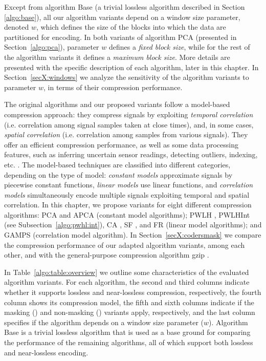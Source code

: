Except from algorithm Base (a trivial lossless algorithm described in Section \ref{algo:base}), all our algorithm variants depend on a window size parameter, denoted $w$, which defines the size of the blocks into which the data are partitioned for encoding. In both variants of algorithm PCA (presented in Section~\ref{algo:pca}), parameter $w$ defines a \textit{fixed block size}, while for the rest of the algorithm variants it defines a \textit{maximum block size}. More details are presented with the specific description of each algorithm, later in this chapter. In Section~\ref{secX:windows} we analyze the sensitivity of the algorithm variants to parameter $w$, in terms of their compression performance.


The original algorithms and our proposed variants follow a model-based compression approach: they compress signals by exploiting \textit{temporal correlation} (i.e. correlation among signal samples taken at close times), and, in some cases, \textit{spatial correlation} (i.e. correlation among samples from various signals). They offer an efficient compression performance, as well as some data processing features, such as inferring uncertain sensor readings, detecting outliers, indexing, etc. \cite{AnEva2013}. The model-based techniques are classified into different categories, depending on the type of model: \textit{constant models} approximate signals by piecewise constant functions, \textit{linear models} use linear functions, and \textit{correlation models} simultaneously encode multiple signals exploiting temporal and spatial correlation. In this chapter, we propose variants for eight different compression algorithms: PCA \cite{coder:pca} and APCA \cite{coder:apca} (constant model algorithms); PWLH \cite{coder:pwlh}, PWLHInt (see Subsection~\ref{algo:pwhl:int}), CA \cite{coder:ca}, SF \cite{coder:sf}, and FR \cite{coder:fr} (linear model algorithms); and GAMPS \cite{coder:gamps} (correlation model algorithm). In Section~\ref{secX:codersmask} we compare the compression performance of our adapted algorithm variants, among each other, and with the general-purpose compression algorithm gzip \cite{gzip}.


In Table~\ref{algo:table:overview} we outline some characteristics of the evaluated algorithm variants. For each algorithm, the second and third columns indicate whether it supports lossless and near-lossless compression, respectively, the fourth column shows its compression model, the fifth and sixth columns indicate if the masking (\maskalgo) and non-masking (\NOmaskalgo) variants apply, respectively, and the last column specifies if the algorithm depends on a window size parameter ($w$). Algorithm Base is a trivial lossless algorithm that is used as a base ground for comparing the performance of the remaining algorithms, all of which support both lossless and near-lossless encoding.


\clearpage




